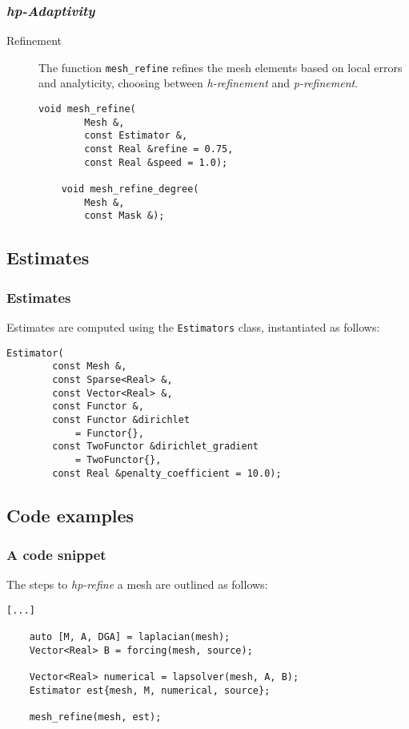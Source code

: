 \begin{frame}[fragile]
    \frametitle{\textit{hp-Adaptivity}}

    \begin{description}
        \item[Refinement] The function \lstinline{mesh_refine} refines the mesh elements based on local errors and analyticity, choosing between \textit{h-refinement} and \textit{p-refinement}.

    \begin{lstlisting}[style=cpp]
    void mesh_refine(
        Mesh &, 
        const Estimator &, 
        const Real &refine = 0.75, 
        const Real &speed = 1.0);

    void mesh_refine_degree(
        Mesh &, 
        const Mask &);
    \end{lstlisting}
    \end{description}

\end{frame}

\subsection{Estimates}

\begin{frame}[fragile]
    \frametitle{Estimates}

    Estimates are computed using the \lstinline{Estimators} class, instantiated as follows:

    \begin{lstlisting}[style=cpp]
    Estimator(
        const Mesh &, 
        const Sparse<Real> &, 
        const Vector<Real> &, 
        const Functor &, 
        const Functor &dirichlet
            = Functor{}, 
        const TwoFunctor &dirichlet_gradient
            = TwoFunctor{}, 
        const Real &penalty_coefficient = 10.0);
    \end{lstlisting}

\end{frame}

\subsection{Code examples}

\begin{frame}[fragile]
    \frametitle{A code snippet}

    The steps to \textit{hp-refine} a mesh are outlined as follows:

    \begin{lstlisting}[style=cpp]
    [...]

    auto [M, A, DGA] = laplacian(mesh);
    Vector<Real> B = forcing(mesh, source);

    Vector<Real> numerical = lapsolver(mesh, A, B);
    Estimator est{mesh, M, numerical, source};

    mesh_refine(mesh, est);
    \end{lstlisting}

\end{frame}